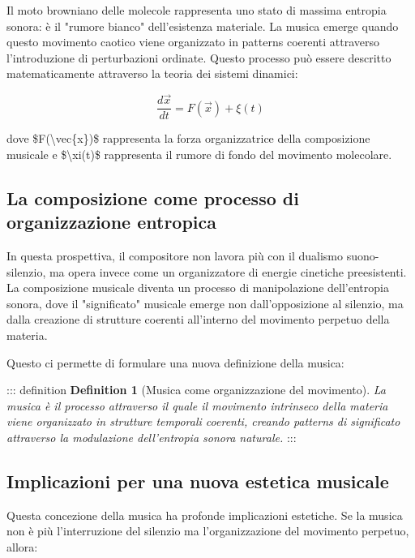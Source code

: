 \documentclass[a4paper,11pt]{article}
\begin{document}
Il moto browniano delle molecole rappresenta uno stato di massima
entropia sonora: è il "rumore bianco" dell'esistenza materiale. La
musica emerge quando questo movimento caotico viene organizzato in
patterns coerenti attraverso l'introduzione di perturbazioni ordinate.
Questo processo può essere descritto matematicamente attraverso la
teoria dei sistemi dinamici:

\begin{displaymath}
\frac{d\vec{x}}{dt} = F(\vec{x}) + \xi(t)
\end{displaymath}

dove \$F(\textbackslash{}vec\{x\})\$ rappresenta la forza organizzatrice della composizione
musicale e \$\textbackslash{}xi(t)\$ rappresenta il rumore di fondo del movimento
molecolare.

\subsection{La composizione come processo di organizzazione entropica}\hypertarget{la-composizione-come-processo-di-organizzazione-entropica}{}\label{la-composizione-come-processo-di-organizzazione-entropica}

In questa prospettiva, il compositore non lavora più con il dualismo
suono-silenzio, ma opera invece come un organizzatore di energie
cinetiche preesistenti. La composizione musicale diventa un processo di
manipolazione dell'entropia sonora, dove il "significato" musicale
emerge non dall'opposizione al silenzio, ma dalla creazione di strutture
coerenti all'interno del movimento perpetuo della materia.

Questo ci permette di formulare una nuova definizione della musica:

::: definition
\textbf{Definition 1} (Musica come organizzazione del movimento). \emph{La musica
è il processo attraverso il quale il movimento intrinseco della materia
viene organizzato in strutture temporali coerenti, creando patterns di
significato attraverso la modulazione dell'entropia sonora naturale.}
:::

\subsection{Implicazioni per una nuova estetica musicale}\hypertarget{implicazioni-per-una-nuova-estetica-musicale}{}\label{implicazioni-per-una-nuova-estetica-musicale}

Questa concezione della musica ha profonde implicazioni estetiche. Se la
musica non è più l'interruzione del silenzio ma l'organizzazione del
movimento perpetuo, allora:
\end{document}
